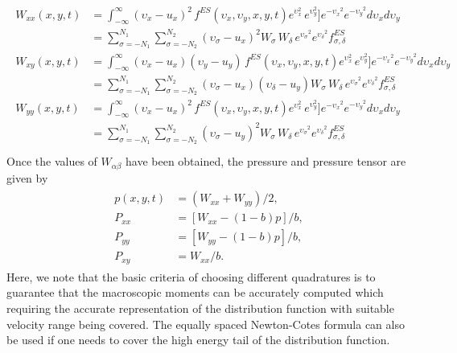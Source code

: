 \documentclass{rsproca}%
\begin{document}
\begin{align}
	\begin{split}
W_{xx}(x,y,t) &= \int^{\infty}_{-\infty} (\upsilon_x - u_x)^2 \, f^{ES}(\upsilon_x,\upsilon_y,x,y,t) e^{\upsilon_x^2}\,e^{\upsilon_y^2}] e^{-{\upsilon_x}^2} e^{-{\upsilon_y}^2} d\upsilon_x d\upsilon_y \\
&= \sum^{N_1}_{\sigma=-N_1}\sum^{N_2}_{\sigma=-N_2} (\upsilon_{\sigma} - u_x)^2 W_\sigma\,W_\delta\,e^{{\upsilon_\sigma}^2}e^{{\upsilon_\delta}^2}f^{ES}_{\sigma,\delta}  \\
W_{xy}(x,y,t) &= \int^{\infty}_{-\infty} (\upsilon_x - u_x) (\upsilon_y - u_y) \, f^{ES}(\upsilon_x,\upsilon_y,x,y,t) e^{\upsilon_x^2}\,e^{\upsilon_y^2}] e^{-{\upsilon_x}^2} e^{-{\upsilon_y}^2} d\upsilon_x d\upsilon_y \\
&= \sum^{N_1}_{\sigma=-N_1}\sum^{N_2}_{\sigma=-N_2} (\upsilon_{\sigma} - u_x) (\upsilon_{\delta} - u_y) W_\sigma\,W_\delta\,e^{{\upsilon_\sigma}^2}e^{{\upsilon_\delta}^2}f^{ES}_{\sigma,\delta}  \\
W_{yy}(x,y,t) &= \int^{\infty}_{-\infty} (\upsilon_x - u_x)^2 \, f^{ES}(\upsilon_x,\upsilon_y,x,y,t) e^{\upsilon_x^2}\,e^{\upsilon_y^2}] e^{-{\upsilon_x}^2} e^{-{\upsilon_y}^2} d\upsilon_x d\upsilon_y \\
&= \sum^{N_1}_{\sigma=-N_1}\sum^{N_2}_{\sigma=-N_2} (\upsilon_{\sigma} - u_y)^2 W_\sigma\,W_\delta\,e^{{\upsilon_\sigma}^2}e^{{\upsilon_\delta}^2}f^{ES}_{\sigma,\delta}  \\
	\end{split}
\end{align}
Once the values of $W_{\alpha \beta}$ have been obtained, the pressure and pressure tensor are given by
\begin{align}
	\begin{split}
p(x,y,t) 	&= (W_{xx} + W_{yy})/2, \\
P_{xx} 		&= [W_{xx} - (1-b)p]/b, \\
P_{yy} 		&= [W_{yy} - (1-b)p]/b, \\
P_{xy} 		&= W_{xx}/b.
	\end{split}
\end{align}
Here, we note that the basic criteria of choosing different quadratures is to guarantee that the macroscopic moments can be accurately computed which requiring the accurate representation of the distribution function with suitable velocity range being covered.   The equally spaced Newton-Cotes formula can also be used if one needs to cover the high energy tail of the distribution function.
\end{document}
